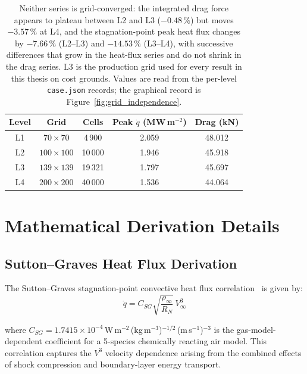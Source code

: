 \begin{table}[H]
\centering
\caption{Grid independence study: surface quantities across four refinement levels.}
\label{tab:grid_study}
\begin{tabular}{ccccc}
\hline
\textbf{Level} & \textbf{Grid} & \textbf{Cells} & \textbf{Peak $\dot q$ (MW\,m$^{-2}$)} & \textbf{Drag (kN)} \\
\hline
L1 & $70\times70$ & 4\,900 & 2.059 & 48.012 \\
L2 & $100\times100$ & 10\,000 & 1.946 & 45.918 \\
L3 & $139\times139$ & 19\,321 & 1.797 & 45.697 \\
L4 & $200\times200$ & 40\,000 & 1.536 & 44.064 \\
\hline
\end{tabular}
\caption*{Neither series is grid-converged: the integrated drag force appears to plateau between L2 and L3 ($-0.48\,\%$) but moves $-3.57\,\%$ at L4, and the stagnation-point peak heat flux changes by $-7.66\,\%$ (L2--L3) and $-14.53\,\%$ (L3--L4), with successive differences that grow in the heat-flux series and do not shrink in the drag series. L3 is the production grid used for every result in this thesis on cost grounds. Values are read from the per-level \texttt{case.json} records; the graphical record is Figure~\ref{fig:grid_independence}.}
\end{table}

\chapter{Mathematical Derivation Details}
\label{app:derivations}

\section{Sutton--Graves Heat Flux Derivation}

The Sutton--Graves stagnation-point convective heat flux correlation~\cite{sutton1971gravesh} is given by:
\begin{equation}
    \dot{q} = C_{SG} \sqrt{\frac{\rho_\infty}{R_N}} \, V_\infty^3
    \label{eq:sg_derivation}
\end{equation}

\noindent where $C_{SG} = 1.7415 \times 10^{-4}$\,W\,m$^{-2}$\,(kg\,m$^{-3}$)$^{-1/2}$\,(m\,s$^{-1}$)$^{-3}$ is the gas-model-dependent coefficient for a 5-species chemically reacting air model. This correlation captures the $V^3$ velocity dependence arising from the combined effects of shock compression and boundary-layer energy transport.

